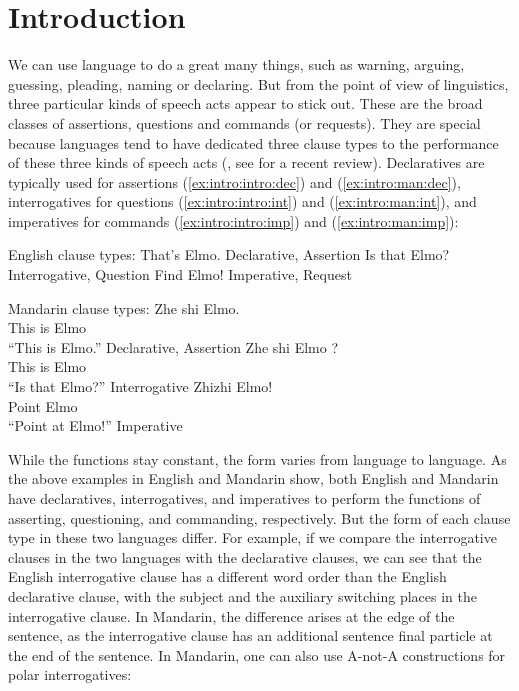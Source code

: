 \chapter{Introduction}
\label{chap:introduction}

We can use language to do a great many things, such as warning, arguing, guessing, pleading, naming or declaring. But from the point of view of linguistics, three particular kinds of speech acts appear to stick out.
These are the broad classes of assertions, questions and commands (or requests). They are special because
languages tend to have dedicated three clause types to the performance of these three kinds of speech acts (\citealt{sz1985speechact, konig2007, aikhenvald2016, portner2018}, see \cite{konig2020} for a recent review). Declaratives are typically used for assertions (\ref{ex:intro:intro:dec}) and (\ref{ex:intro:man:dec}), interrogatives for questions (\ref{ex:intro:intro:int}) and (\ref{ex:intro:man:int}), and imperatives for commands (\ref{ex:intro:intro:imp}) and (\ref{ex:intro:man:imp}):

English clause types:
\bxl \label{ex:intro:intro:dec}
That's Elmo. \hfill Declarative, Assertion
\ex\label{ex:intro:intro:int} Is that Elmo? \hfill Interrogative, Question
\ex\label{ex:intro:intro:imp} Find Elmo! \hfill Imperative, Request
\exl
\eex

Mandarin clause types:
\bxl \label{ex:intro:man:dec}
\gll Zhe shi Elmo.\\
This is Elmo\\
\trans ``This is Elmo.'' \hfill Declarative, Assertion
\ex \label{ex:intro:man:int}
\gll Zhe shi Elmo ?\\
This is Elmo \Sfp\\
\trans ``Is that Elmo?'' \hfill Interrogative
\ex \label{ex:intro:man:imp}
\gll Zhizhi Elmo!\\
Point Elmo\\
\trans ``Point at Elmo!'' \hfill Imperative
\exl
\eex

While the functions stay constant, the form varies from language to language. As the above examples in English and Mandarin show,  both English and Mandarin have declaratives, interrogatives, and imperatives to perform the functions of asserting, questioning, and commanding, respectively. But the form of each clause type in these two languages differ. For example, if we compare the interrogative clauses in the two languages with the declarative clauses, we can see that the English interrogative clause has a different word order than the English declarative clause, with the subject and the auxiliary switching places in the interrogative clause. In Mandarin, the difference arises at the edge of the sentence, as the interrogative clause has an additional sentence final particle  at the end of the sentence. In Mandarin, one can also use A-not-A constructions for polar interrogatives:

